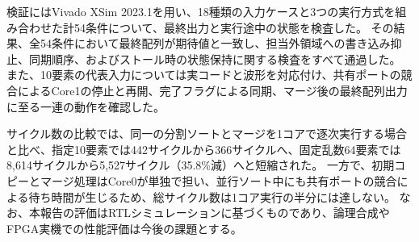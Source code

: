 \documentclass[dvipdfmx,12pt,a4j]{jreport}
\begin{document}
検証にはVivado XSim 2023.1を用い、18種類の入力ケースと3つの実行方式を組み合わせた計54条件について、最終出力と実行途中の状態を検査した。
その結果、全54条件において最終配列が期待値と一致し、担当外領域への書き込み抑止、同期順序、およびストール時の状態保持に関する検査をすべて通過した。
また、10要素の代表入力については実コードと波形を対応付け、共有ポートの競合によるCore1の停止と再開、完了フラグによる同期、マージ後の最終配列出力に至る一連の動作を確認した。

サイクル数の比較では、同一の分割ソートとマージを1コアで逐次実行する場合と比べ、指定10要素では442サイクルから366サイクルへ、固定乱数64要素では8,614サイクルから5,527サイクル（35.8\%減）へと短縮された。
一方で、初期コピーとマージ処理はCore0が単独で担い、並行ソート中にも共有ポートの競合による待ち時間が生じるため、総サイクル数は1コア実行の半分には達しない。
なお、本報告の評価はRTLシミュレーションに基づくものであり、論理合成やFPGA実機での性能評価は今後の課題とする。


\clearpage\setcounter{page}{0}\pagestyle{plain}\hypersetup{pageanchor=true}
\tableofcontents
\begingroup
\renewcommand{\addvspace}[1]{}
\listoffigures
\listoftables
\endgroup
\clearpage\setcounter{page}{0}







\renewcommand{\bibname}{参考文献}
\renewcommand{\em}{\it}





\end{document}
